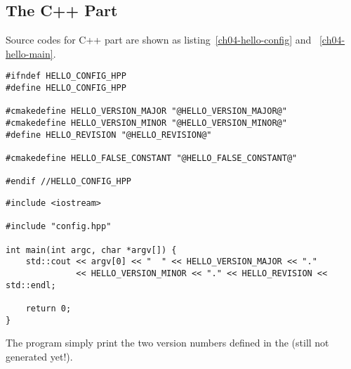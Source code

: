 \subsection{The C++ Part}
Source codes for C++ part are shown as listing~\ref{ch04-hello-config} and ~\ref{ch04-hello-main}. \par
\begin{lstlisting}[caption=\texttt{config.hpp.in},label=ch04-hello-config]
#ifndef HELLO_CONFIG_HPP
#define HELLO_CONFIG_HPP

#cmakedefine HELLO_VERSION_MAJOR "@HELLO_VERSION_MAJOR@"
#cmakedefine HELLO_VERSION_MINOR "@HELLO_VERSION_MINOR@"
#define HELLO_REVISION "@HELLO_REVISION@"

#cmakedefine HELLO_FALSE_CONSTANT "@HELLO_FALSE_CONSTANT@"

#endif //HELLO_CONFIG_HPP
\end{lstlisting}
\begin{lstlisting}[caption=\texttt{hello.cpp},label=ch04-hello-main]
#include <iostream>

#include "config.hpp"

int main(int argc, char *argv[]) {
    std::cout << argv[0] << "  " << HELLO_VERSION_MAJOR << "."
              << HELLO_VERSION_MINOR << "." << HELLO_REVISION << std::endl;

    return 0;
}
\end{lstlisting}
The program simply print the two version numbers defined in the  (still not generated yet!).
